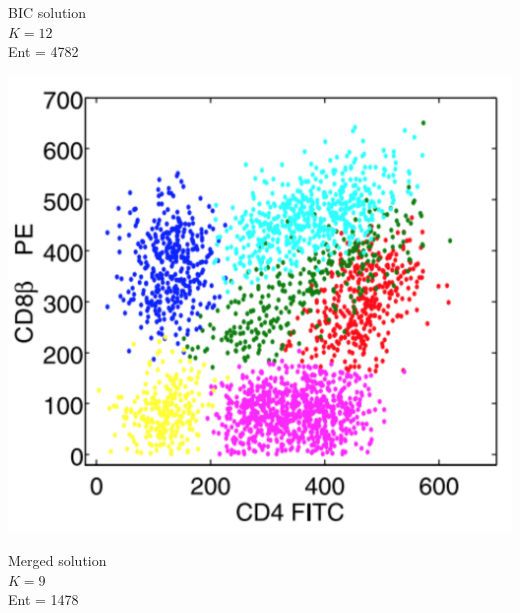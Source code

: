 \documentclass[mathserif,compress]{beamer}
\renewcommand\;{\,}
\begin{document}
\begin{frame}
\begin{center}
\begin{minipage}{0.3\linewidth}
\begin{center}
BIC solution
\\
$K = 12$
\\
Ent = 4782
\end{center}
\end{minipage}
\hfill
\begin{minipage}{0.3\linewidth}
\includegraphics[width=\linewidth]{Combined_positive.png}
\begin{center}
Merged solution
\\
$K = 9$
\\
Ent = 1478
\end{center}
\end{minipage}
\end{center}
\end{frame}
\end{document}
